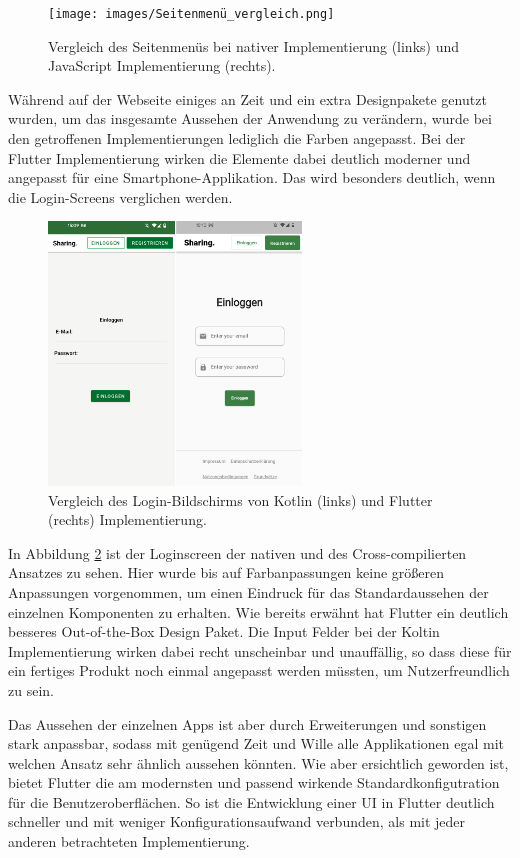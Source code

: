 \begin{figure}[ht]
  \centering
  \texttt{[image: images/Seitenmenü\_vergleich.png]} 
  \caption[Vergleich des Seitenmenüs der nativen und hybriden Applikation]{Vergleich des Seitenmenüs bei nativer Implementierung (links) und JavaScript Implementierung (rechts).}
  \label{fig:sidemenu}
\end{figure}

Während auf der Webseite einiges an Zeit und ein extra Designpakete genutzt wurden, um das insgesamte Aussehen der Anwendung zu verändern, wurde bei den getroffenen Implementierungen lediglich die Farben angepasst. Bei der Flutter Implementierung wirken die Elemente dabei deutlich moderner und angepasst für eine Smartphone-Applikation. Das wird besonders deutlich, wenn die Login-Screens verglichen werden.

\begin{figure}[ht]
  \centering
  \includegraphics[height=7cm,keepaspectratio]{images/Login_vergleich.png} 
  \caption[Vergleich des Login-Bildschirms von Kotlin und Flutter Implementierung.]{Vergleich des Login-Bildschirms von Kotlin (links) und Flutter (rechts) Implementierung.}
  \label{fig:loginscreen}
\end{figure}

In Abbildung \ref{fig:loginscreen} ist der Loginscreen der nativen und des Cross-compilierten Ansatzes zu sehen. Hier wurde bis auf Farbanpassungen keine größeren Anpassungen vorgenommen, um einen Eindruck für das Standardaussehen der einzelnen Komponenten zu erhalten. Wie bereits erwähnt hat Flutter ein deutlich besseres Out-of-the-Box Design Paket. Die Input Felder bei der Koltin Implementierung wirken dabei recht unscheinbar und unauffällig, so dass diese für ein fertiges Produkt noch einmal angepasst werden müssten, um Nutzerfreundlich zu sein.

Das Aussehen der einzelnen Apps ist aber durch Erweiterungen und sonstigen stark anpassbar, sodass mit genügend Zeit und Wille alle Applikationen egal mit welchen Ansatz sehr ähnlich aussehen könnten. Wie aber ersichtlich geworden ist, bietet Flutter die am modernsten und passend wirkende Standardkonfigutration für die Benutzeroberflächen. So ist die Entwicklung einer UI in Flutter deutlich schneller und mit weniger Konfigurationsaufwand verbunden, als mit jeder anderen betrachteten Implementierung.

